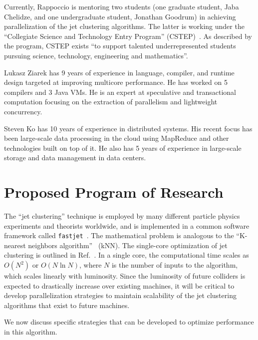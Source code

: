 \documentclass[times,11pt]{article}
\begin{document}
Currently, Rappoccio is mentoring two students (one graduate student,
Jaba Chelidze, and one undergraduate student, Jonathan Goodrum) in
achieving parallelization of the jet clustering algorithms. The latter
is working under the ``Collegiate Science and Technology Entry
Program'' (CSTEP)~\cite{cstep}. As described by the program, CSTEP
exists ``to support talented underrepresented students pursuing
science, technology, engineering and mathematics''. 


Lukasz Ziarek has 9 years of experience in language, compiler,
and runtime design targeted at improving multicore performance.  He
has worked on 5 compilers and 3 Java VMs. He is an expert at
speculative and transactional computation focusing on the extraction
of parallelism and lightweight concurrency. 



Steven Ko has 10 years of experience in distributed systems. His
recent focus has been large-scale data processing in the cloud using
MapReduce and other technologies built on top of it. He also has 5
years of experience in large-scale storage and data management in
data centers.


\section{Proposed Program of Research}


The
``jet clustering'' technique is employed by
many different particle physics experiments and theorists worldwide, and is
implemented in a common software framework called 
{\tt fastjet}~\cite{fastjet_manual}. 
The mathematical problem is analogous to the
``K-nearest neighbors algorithm''~\cite{knn_ieee} (kNN). 
The single-core optimization of
jet clustering
is outlined in Ref.~\cite{fastjet_timing}. In a single core,
the computational time scales as $O(N^2)$ or  $O(N \ln{N})$, where $N$
is the number of inputs to the algorithm, which scales linearly with
luminosity. Since the luminosity of future colliders is expected to
drastically increase over existing machines, it will be critical to
develop parallelization strategies to maintain scalability of the jet
clustering algorithms that exist to future machines. 


We now
discuss specific strategies that can be developed 
to optimize performance in this algorithm. 


\iffalse
There is existing work and literature on the topic of the
parallelization of similar kNN algorithms, for instance, in
Refs.~\cite{knn_gpu_1, knn_gpu_2, knn_gpu_3}, where improvements
$O(100)$ in CPU performance are observed over standard
algorithms. Since the proposed use case is
very similar to the kNN algorithm, similar improvements to the
processing time by parallelization strategies are expected. 
\fi
\end{document}
